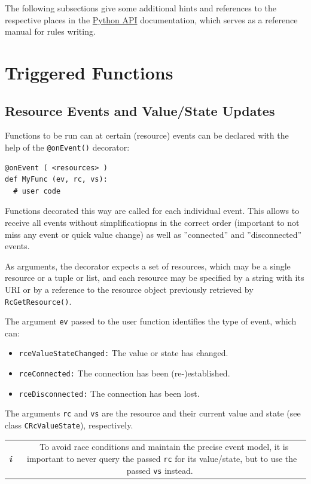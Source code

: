 \documentclass[12pt,english,parskip=half]{scrreprt}
\newcommand{\projecturl}{}
\newcommand{\infobox}[1]{
  \hfill
  \setlength\arrayrulewidth{1pt}
  \begin{tabular}[t]{c|c|}
    \parbox{1.8em}{\hfill\textit{\Huge\textbf{i}\,}}
    &
    \,\parbox{0.89\linewidth}{\setlength{\parskip}{0.5em}#1}\,
  \end{tabular}
  \par
}
\newcommand{\docref}[2]{\href{\projecturl#1}{#2}}
\newcommand{\refapipython}{\docref{home2l-api_python/index.html}{Python API}}
\begin{document}
The following subsections give some additional hints and references to
the respective places in the \refapipython{}
documentation, which serves as a reference manual for rules writing.



\section{Triggered Functions}
\label{sec:rules-events}


\subsection{Resource Events and Value/State Updates}

Functions to be run can at certain (resource) events can be declared
with the help of the \texttt{@onEvent()} decorator:

\begin{lstlisting}
@onEvent ( <resources> )
def MyFunc (ev, rc, vs):
  # user code
\end{lstlisting}

Functions decorated this way are called for each individual event.
This allows to receive all events without simplificatiopns in the correct
order (important to not miss any event or quick value change) as well
as ''connected'' and ''disconnected'' events.

As arguments, the decorator expects a set of resources, which may be a
single resource or a tuple or list, and each resource may be specified
by a string with its URI or by a reference to the resource object
previously retrieved by \texttt{RcGetResource()}.

The argument \texttt{ev} passed to the user function identifies the type of event,
which can:
\begin{itemize}
  \item \texttt{rceValueStateChanged:} The value or state has changed.
  \item \texttt{rceConnected:} The connection has been (re-)established.
  \item \texttt{rceDisconnected:} The connection has been lost.
\end{itemize}
The arguments \texttt{rc} and \texttt{vs} are the resource and their
current value and state (see class \texttt{CRcValueState}), respectively.

\infobox{
  To avoid race conditions and maintain the precise event model, it is important
  to never query the passed \texttt{rc} for its value/state, but to use the
  passed \texttt{vs} instead.
}
\end{document}

